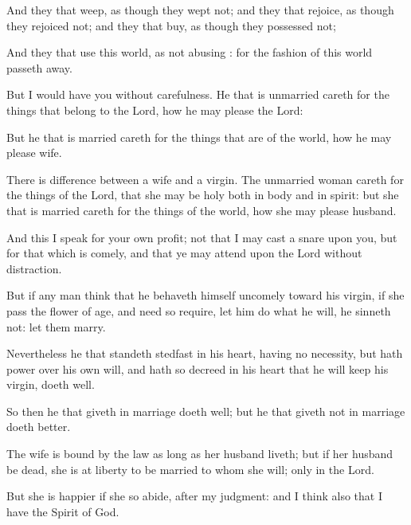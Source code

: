 {And
they that
weep, as
though they
wept
not;
and
they that
rejoice, as
though they
rejoiced
not;
and
they that
buy, as
though they
possessed
not;

And
they that
use
this
world,
as
not
abusing
{}:
for the
fashion of
this
world passeth
away.

But I would
have
you without
carefulness.
He that
is
unmarried careth
for the
things that belong to the
Lord,
how he may
please the
Lord:

But
he that is
married careth
for the
things that are of the
world,
how he may
please
{}
wife.

There is
difference
{}
between a
wife
and a
virgin. The
unmarried woman careth
for the
things of the
Lord,
that she may
be
holy
both in
body
and in
spirit:
but
she that is
married careth
for the
things of the
world,
how she may
please
{}
husband.

And
this I
speak
for
your
own
profit;
not
that I may
cast a
snare upon
you,
but
for that which is
comely,
and that ye may attend
upon the
Lord without
distraction.

But
if any
man
think
that he
behaveth
himself
uncomely
toward his
virgin,
if she
pass the flower
of
{}
age,
and
need
so
require, let him
do what he
will, he
sinneth
not: let them
marry.

Nevertheless he
that
standeth
stedfast
in his
heart,
having
no
necessity,
but
hath
power
over his
own
will,
and
hath
so
decreed
in
his
heart that he will
keep
his
virgin,
doeth
well.

So
then
he that
giveth
{} in
marriage
doeth
well;
but
he that
giveth
{}
not in
marriage
doeth
better.

The
wife is
bound by the
law
as
long
as
her
husband
liveth;
but
if
her
husband be
dead, she
is at
liberty to be married
to
whom she
will;
only
in the
Lord.

But she
is
happier
if
she
so
abide,
after
my
judgment:
and
I
think
also that I
have the
Spirit of
God.




\par }
